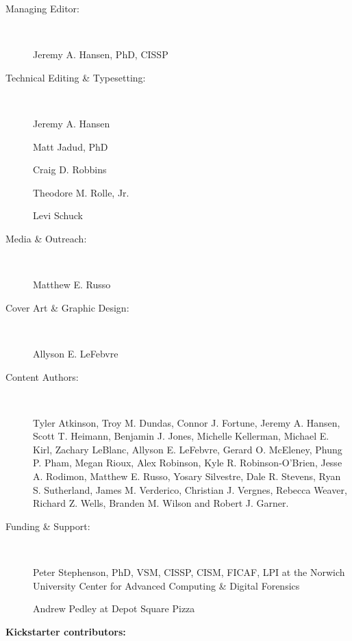 \documentclass[11pt,final]{book}
\begin{document}
 \begin{description}

 \item[Managing Editor:] ~
 
 Jeremy A. Hansen, PhD, CISSP

 \item[Technical Editing \& Typesetting:] ~
 
 Jeremy A. Hansen
 
 Matt Jadud, PhD
 
 Craig D. Robbins
 
 Theodore M. Rolle, Jr.
 
 Levi Schuck

 \item[Media \& Outreach:] ~
 
 Matthew E. Russo

 \item[Cover Art \& Graphic Design:] ~
 
 Allyson E. LeFebvre

 \item[Content Authors:]\label{ContentAuthors} ~
 
Tyler Atkinson,
Troy M. Dundas,
Connor J. Fortune,
Jeremy A. Hansen,
Scott T. Heimann,
Benjamin J. Jones,
Michelle Kellerman,
Michael E. Kirl,
Zachary LeBlanc,
Allyson E. LeFebvre,
Gerard O. McEleney,
Phung P. Pham,
Megan Rioux,
Alex Robinson,
Kyle R. Robinson-O'Brien,
Jesse A. Rodimon,
Matthew E. Russo,
Yosary Silvestre,
Dale R. Stevens,
Ryan S. Sutherland,
James M. Verderico,
Christian J. Vergnes,
Rebecca Weaver,
Richard Z. Wells, 
Branden M. Wilson and
Robert J. Garner.

 \item[Funding \& Support:] ~
 
Peter Stephenson, PhD, VSM, CISSP, CISM, FICAF, LPI at the Norwich University Center for Advanced Computing \& Digital Forensics

Andrew Pedley at Depot Square Pizza
 \end{description}

\noindent \textbf{Kickstarter contributors:}   

\noindent 

\end{document}
